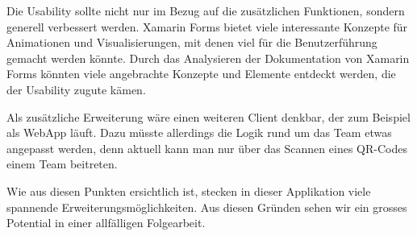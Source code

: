 Die Usability sollte nicht nur im Bezug auf die zusätzlichen Funktionen, sondern generell verbessert werden. Xamarin Forms bietet viele interessante Konzepte für Animationen und Visualisierungen, mit denen viel für die Benutzerführung gemacht werden könnte. Durch das Analysieren der Dokumentation von Xamarin Forms könnten viele angebrachte Konzepte und Elemente entdeckt werden, die der Usability zugute kämen.

Als zusätzliche Erweiterung wäre einen weiteren Client denkbar, der zum Beispiel als WebApp läuft. Dazu müsste allerdings die Logik rund um das Team etwas angepasst werden, denn aktuell kann man nur über das Scannen eines QR-Codes einem Team beitreten.

Wie aus diesen Punkten ersichtlich ist, stecken in dieser Applikation viele spannende Erweiterungsmöglichkeiten. Aus diesen Gründen sehen wir ein grosses Potential in einer allfälligen Folgearbeit.
